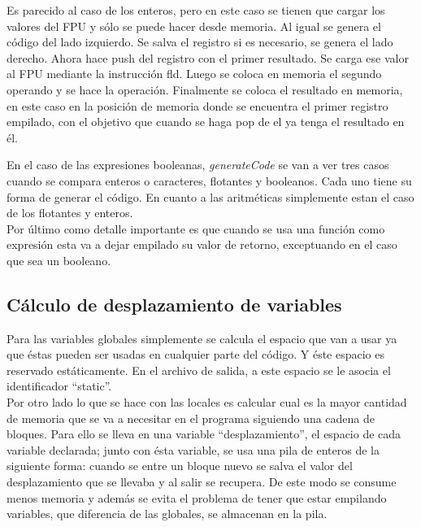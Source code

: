 \documentclass[11pt, spanish]{report}
\begin{document}
Es parecido al caso de los enteros, pero en este caso se tienen que cargar los valores del FPU y s\'olo se puede hacer desde memoria. Al igual se
genera el c\'odigo del lado izquierdo. Se salva el registro si es necesario, se genera el lado derecho. Ahora hace push del registro con el primer
resultado. Se carga ese valor al FPU mediante la instrucci\'on fld. Luego se coloca en memoria el segundo operando y se hace la operaci\'on. Finalmente
se coloca el resultado en memoria, en este caso en la posici\'on de memoria donde se encuentra el primer registro empilado, con el objetivo que cuando 
se haga pop de el ya tenga el resultado en \'el.

En el caso de las expresiones booleanas,  \emph{generateCode} se van a ver tres casos cuando se compara enteros o caracteres, flotantes
y booleanos. Cada uno tiene su forma de generar el c\'odigo. En cuanto a las aritm\'eticas simplemente estan el caso de los flotantes y enteros.\\

Por \'ultimo como detalle importante es que cuando se usa una funci\'on como expresi\'on esta va a dejar empilado su valor de retorno, exceptuando en el caso que sea un booleano.\\

\subsection{C\'alculo de desplazamiento de variables}

Para las variables globales simplemente se calcula el espacio que van a usar ya que \'estas pueden ser usadas en cualquier parte del c\'odigo. Y \'este espacio es 
reservado est\'aticamente. En el archivo de salida, a este espacio se le asocia el identificador ``static''.\\

Por otro lado lo que se hace con las locales es calcular cual es la mayor cantidad de memoria que se va a necesitar en el programa siguiendo una cadena de bloques. 
Para ello se lleva en una variable ``desplazamiento'', el espacio de cada variable declarada; junto con \'esta variable, se usa una pila de enteros de la siguiente 
forma: cuando se entre un bloque nuevo se salva el valor del desplazamiento que se llevaba y al salir se recupera. De este modo se consume menos memoria y adem\'as 
se evita el problema de tener que estar empilando variables, que diferencia de las globales, se almacenan en la pila.\\
\end{document}
